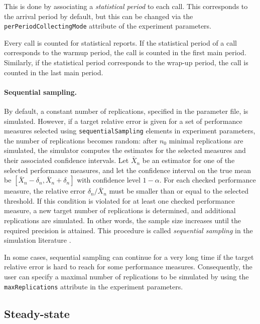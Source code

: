 This is done by associating a \emph{statistical period} to each call.
This corresponds to the arrival period by
default, but this can be changed via the
\texttt{per\-Period\-Collecting\-Mode} attribute of the
experiment parameters. %

Every call is counted for statistical reports.  If the statistical
period of a call corresponds to the warmup period, the call is counted
in the first main period.  Similarly, if the statistical period
corresponds to the wrap-up period, the call is counted in the last
main period.

\paragraph{Sequential sampling.}
By default, a constant number of replications, specified in the
parameter file, is
simulated.  However, if a target relative error is given for a
set of performance measures selected using
\texttt{sequential\-Sampling} elements in experiment parameters, the
number of
replications becomes random: after $n_0$ minimal replications are
simulated, the simulator computes the estimates for the selected
measures and their
associated confidence
intervals.  Let $\bar X_n$ be an estimator
for one of the selected performance measures, and let the
confidence interval on the true mean be $[\bar X_n - \delta_n, \bar X_n +
\delta_n]$ with
confidence level $1-\alpha$.  For each checked performance measure,
the relative error $\delta_n/\bar X_n$ must be smaller than or equal to the
selected threshold.  If this condition is violated for at least one
checked performance measure,
a new target number of
replications is determined, and additional replications are simulated.
In other words, the sample size increases until the required precision
is attained.  This procedure is called \emph{sequential sampling} in
the simulation literature \cite{sLAW00a}.

In some cases, sequential sampling can continue for a very long time
if the target
relative error is hard to reach for some performance measures.
Consequently,
the user can specify a maximal number of replications to
be simulated by using the
\texttt{max\-Replications} attribute in the experiment parameters.

\subsection{Steady-state}
\label{sec:expsteadystate}

